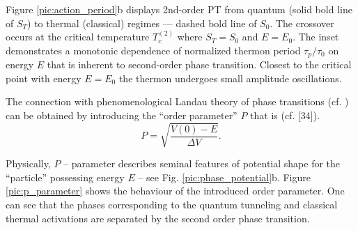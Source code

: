 \documentclass[fleqn,10pt]{wlscirep}
\begin{document}
Figure \ref{pic:action_period}b displays 2nd-order PT from quantum (solid bold line of $S_T$) to thermal (classical) regimes --- dashed bold line of $S_0$.
The crossover occurs at the critical temperature $T_{c}^{(2)}$ where $S_T = S_0$ and {$E = E_0$}.
The inset demonstrates a monotonic dependence of normalized thermon period $\tau_p/\tau_0$ on energy $E$ that is inherent to second-order phase transition.
Closest to the critical point with energy $E=E_0$ the thermon undergoes small amplitude oscillations.

The connection with phenomenological Landau theory of phase transitions  (cf. \cite{Lif}) can be obtained by introducing the ``order parameter'' $P$ that is  (cf. [34]).
%
\begin{equation}
P = \sqrt{\dfrac{V(0) - E}{\Delta V}}.
\label{eq:p_parameter}
\end{equation}
%

Physically, $P$ -- parameter describes  seminal features of potential shape for the ``particle'' possessing energy $E$ -- see Fig. \ref{pic:phase_potential}b.
Figure \ref{pic:p_parameter} shows the behaviour of the introduced order parameter.
One can see that the phases corresponding to the quantum tunneling and classical thermal activations are separated by the second order phase transition.
\end{document}
